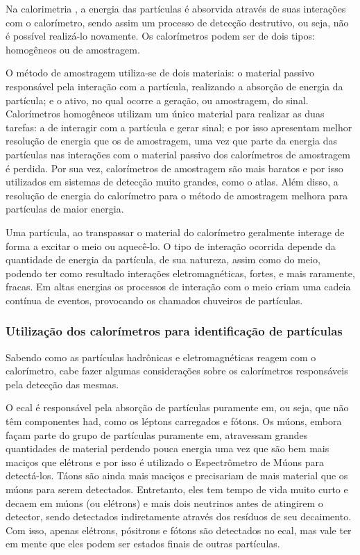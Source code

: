 Na calorimetria \cite{wigmans,tese_torres}, a energia das partículas é 
absorvida através de suas interações com o calorímetro, sendo assim um processo 
de detecção destrutivo, ou seja, não é possível realizá-lo novamente. Os calorímetros 
podem ser de dois tipos: homogêneos ou de amostragem. 

O método de amostragem utiliza-se de dois materiais: o material passivo 
responsável pela interação com a partícula, realizando a absorção de energia da
partícula; e o ativo, no qual ocorre a geração, ou amostragem, do sinal. 
Calorímetros homogêneos utilizam um único material para realizar as duas
tarefas: a de interagir com a partícula e gerar sinal; e por isso apresentam melhor resolução de energia 
que os de amostragem, uma vez que parte da energia das partículas nas interações com o
material passivo dos calorímetros de amostragem é perdida. Por sua vez, calorímetros de amostragem são
mais baratos e por isso utilizados em sistemas de detecção muito grandes, como o
\gls{atlas}. Além disso, a resolução de energia do calorímetro para o método de 
amostragem melhora para partículas de maior energia.

Uma partícula, ao transpassar o material do calorímetro geralmente interage de
forma a excitar o meio ou aquecê-lo. O tipo de interação ocorrida depende da
quantidade de energia da partícula, de sua natureza, assim como do
meio, podendo ter como resultado interações eletromagnéticas, fortes, e mais 
raramente, fracas. Em altas energias os processos de interação com o meio 
criam uma cadeia contínua de eventos, provocando os chamados chuveiros de partículas. 


\subsubsection{Utilização dos calorímetros para identificação de partículas}
\label{par:cal_part_id}


Sabendo como as partículas hadrônicas e eletromagnéticas reagem com
o calorímetro, cabe fazer algumas considerações sobre os calorímetros
responsáveis pela detecção das mesmas. 

O \gls{ecal} é responsável pela absorção de partículas puramente \gls{em}, ou seja, que não têm componentes
\gls{had}, como os léptons carregados e fótons. Os múons, embora façam parte do
grupo de partículas puramente \gls{em}, atravessam
grandes quantidades de material perdendo pouca energia uma vez que são bem mais
maciços que elétrons e por isso é utilizado o Espectrômetro de Múons para
detectá-los. Táons são ainda mais maciços e precisariam de mais
material que os múons para serem detectados. Entretanto, eles tem tempo de vida muito curto e
decaem em múons (ou elétrons) e mais dois neutrinos antes de atingirem o detector, sendo detectados
indiretamente através dos resíduos de seu decaimento. Com isso, apenas elétrons,
pósitrons e fótons são detectados no \gls{ecal}, mas vale ter em mente que eles
podem ser estados finais de outras partículas. 

